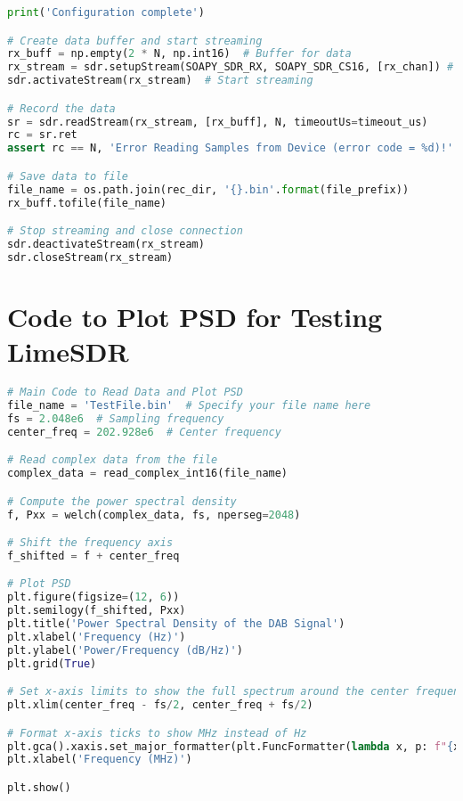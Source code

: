 \begin{appendices}
\begin{lstlisting}[language=Python, caption={Python code for capturing DAB signal using LimeSDR}, label={lst:limeSDR_code}]
print('Configuration complete')

# Create data buffer and start streaming
rx_buff = np.empty(2 * N, np.int16)  # Buffer for data
rx_stream = sdr.setupStream(SOAPY_SDR_RX, SOAPY_SDR_CS16, [rx_chan]) # Setup data stream
sdr.activateStream(rx_stream)  # Start streaming

# Record the data
sr = sdr.readStream(rx_stream, [rx_buff], N, timeoutUs=timeout_us)
rc = sr.ret
assert rc == N, 'Error Reading Samples from Device (error code = %d)!' % rc

# Save data to file
file_name = os.path.join(rec_dir, '{}.bin'.format(file_prefix))
rx_buff.tofile(file_name)

# Stop streaming and close connection
sdr.deactivateStream(rx_stream)
sdr.closeStream(rx_stream)
\end{lstlisting}


\section{Code to Plot PSD for Testing LimeSDR}

\begin{lstlisting}[language=Python, caption={Main Code to Read Data and Plot PSD}, label={lst:main_code}]
# Main Code to Read Data and Plot PSD
file_name = 'TestFile.bin'  # Specify your file name here
fs = 2.048e6  # Sampling frequency
center_freq = 202.928e6  # Center frequency

# Read complex data from the file
complex_data = read_complex_int16(file_name)

# Compute the power spectral density
f, Pxx = welch(complex_data, fs, nperseg=2048)

# Shift the frequency axis
f_shifted = f + center_freq

# Plot PSD
plt.figure(figsize=(12, 6))
plt.semilogy(f_shifted, Pxx)
plt.title('Power Spectral Density of the DAB Signal')
plt.xlabel('Frequency (Hz)')
plt.ylabel('Power/Frequency (dB/Hz)')
plt.grid(True)

# Set x-axis limits to show the full spectrum around the center frequency
plt.xlim(center_freq - fs/2, center_freq + fs/2)

# Format x-axis ticks to show MHz instead of Hz
plt.gca().xaxis.set_major_formatter(plt.FuncFormatter(lambda x, p: f"{x/1e6:.3f}"))
plt.xlabel('Frequency (MHz)')

plt.show()
\end{lstlisting}

\end{appendices}